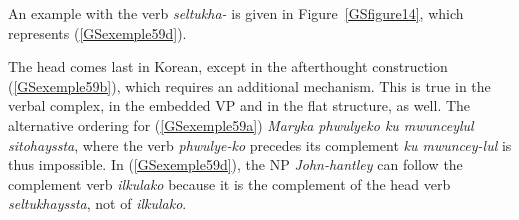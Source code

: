 \documentclass[output=paper
                ,modfonts
                ,nonflat
	        ,collection
	        ,collectionchapter
	        ,collectiontoclongg
 	        ,biblatex
                ,babelshorthands
                ,newtxmath
                ,draftmode
                ,colorlinks, citecolor=brown
]{./langsci/langscibook}
\begin{document}
{\begin{exe}
	\label{GSexemple60} 
	\begin{xlist}
	
	     \end{xlist}
\end{exe}

An example with the verb \emph{seltukha-} is given in Figure~\ref{GSfigure14}, which represents (\ref{GSexemple59d}).


The head comes last in Korean, except in the afterthought construction (\ref{GSexemple59b}), which requires an additional mechanism. This is true in the verbal complex, in the embedded VP and in the flat structure, as well. The alternative ordering for (\ref{GSexemple59a}) \emph{\*Maryka phwulyeko ku mwunceylul sitohayssta}, where the verb \emph{phwulye-ko} precedes its complement \emph{ku mwuncey-lul} is thus impossible. In (\ref{GSexemple59d}), the NP \emph{John-hantley} can follow the complement verb \emph{ilkulako} because it is the complement of the head verb \emph{seltukhayssta}, not of \emph{ilkulako}.  

}
\end{document}
